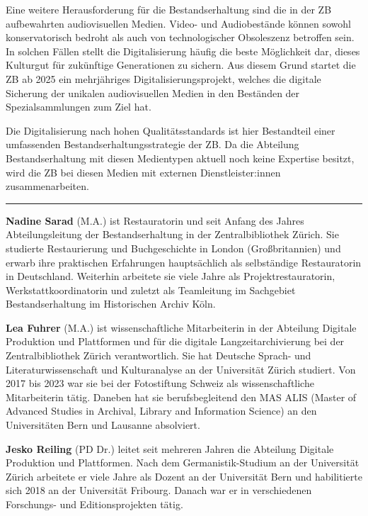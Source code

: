 \documentclass[a4paper,
fontsize=11pt,
oneside,
numbers=noperiodatend,
parskip=half-,
bibliography=totoc,
final
]{scrartcl}
\begin{document}
Eine weitere Herausforderung für die Bestandserhaltung sind die in der
ZB aufbewahrten audiovisuellen Medien. Video- und Audiobestände können
sowohl konservatorisch bedroht als auch von technologischer Obsoleszenz
betroffen sein. In solchen Fällen stellt die Digitalisierung häufig die
beste Möglichkeit dar, dieses Kulturgut für zukünftige Generationen zu
sichern. Aus diesem Grund startet die ZB ab 2025 ein mehrjähriges
Digitalisierungsprojekt, welches die digitale Sicherung der unikalen
audiovisuellen Medien in den Beständen der Spezialsammlungen zum Ziel
hat.

Die Digitalisierung nach hohen Qualitätsstandards ist hier Bestandteil
einer umfassenden Bestandserhaltungsstrategie der ZB. Da die Abteilung
Bestandserhaltung mit diesen Medientypen aktuell noch keine Expertise
besitzt, wird die ZB bei diesen Medien mit externen Dienstleister:innen
zusammenarbeiten.

\begin{center}\rule{0.5\linewidth}{0.5pt}\end{center}

\textbf{Nadine Sarad} (M.A.) ist Restauratorin und seit Anfang des
Jahres Abteilungsleitung der Bestandserhaltung in der Zentralbibliothek
Zürich. Sie studierte Restaurierung und Buchgeschichte in London
(Großbritannien) und erwarb ihre praktischen Erfahrungen hauptsächlich
als selbständige Restauratorin in Deutschland. Weiterhin arbeitete sie
viele Jahre als Projektrestauratorin, Werkstattkoordinatorin und zuletzt
als Teamleitung im Sachgebiet Bestandserhaltung im Historischen Archiv
Köln.

\textbf{Lea Fuhrer} (M.A.) ist wissenschaftliche Mitarbeiterin in der
Abteilung Digitale Produktion und Plattformen und für die digitale
Langzeitarchivierung bei der Zentralbibliothek Zürich verantwortlich.
Sie hat Deutsche Sprach- und Literaturwissenschaft und Kulturanalyse an
der Universität Zürich studiert. Von 2017 bis 2023 war sie bei der
Fotostiftung Schweiz als wissenschaftliche Mitarbeiterin tätig. Daneben
hat sie berufsbegleitend den MAS ALIS (Master of Advanced Studies in
Archival, Library and Information Science) an den Universitäten Bern und
Lausanne absolviert.

\textbf{Jesko Reiling} (PD Dr.) leitet seit mehreren Jahren die
Abteilung Digitale Produktion und Plattformen. Nach dem
Germanistik-Studium an der Universität Zürich arbeitete er viele Jahre
als Dozent an der Universität Bern und habilitierte sich 2018 an der
Universität Fribourg. Danach war er in verschiedenen Forschungs- und
Editionsprojekten tätig.
\end{document}
